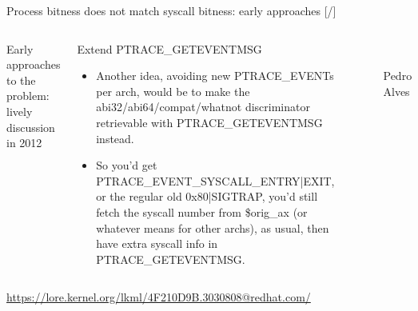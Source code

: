 \documentclass[unicode,aspectratio=169,xcolor={table,dvipsnames,usernames}]{beamer}
\begin{document}
\begin{frame}{Process bitness does not match syscall bitness: early approaches \hfill [\insertframenumber/\inserttotalframenumber]}
\Large
\begin{columns}
	\column{11cm}
		{\large Early approaches to the problem: lively discussion in 2012}
		\begin{block}{Extend PTRACE\_GETEVENTMSG}
		\large
		\begin{itemize}
			\item Another idea, avoiding new PTRACE\_EVENTs per arch,
			would be to make the abi32/abi64/compat/whatnot discriminator
			retrievable with PTRACE\_GETEVENTMSG instead.

			\item So you'd get PTRACE\_EVENT\_SYSCALL\_ENTRY|EXIT,
			or the regular old 0x80|SIGTRAP, you'd still fetch the syscall number
			from \$orig\_ax (or whatever means for other archs), as usual,
			then have extra syscall info in PTRACE\_GETEVENTMSG.
		\end{itemize}
		\end{block}
	\column{2.5cm}
		\begin{figure}
			\centering
			 \\
			Pedro \\ Alves
		\end{figure}
\end{columns}
\bigskip
\tiny
\url{https://lore.kernel.org/lkml/4F210D9B.3030808@redhat.com/}
\end{frame}

\end{document}
